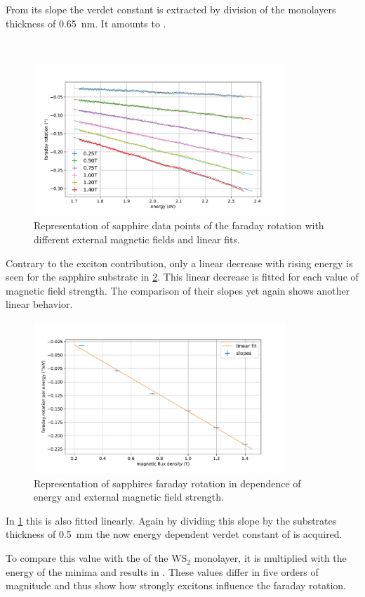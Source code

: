 From its slope the verdet constant is extracted by division of the monolayers thickness of \SI{0.65}{\nano\meter}.
It amounts to \SI{}{}. %

\

\begin{figure}[!ht]
    \centering
    \includegraphics[width=0.85\textwidth]{plots/sapphire_lins.pdf}
    \caption{Representation of sapphire data points of the faraday rotation with different external magnetic fields and linear fits.}
    \label{fig_sapphire_lins}
\end{figure}
Contrary to the exciton contribution, only a linear decrease with rising energy is seen for the sapphire substrate in \cref{fig_sapphire_slopes}.
This linear decrease is fitted for each value of magnetic field strength.
The comparison of their slopes yet again shows another linear behavior.

\begin{figure}[!ht]
    \centering
    \includegraphics[width=0.85\textwidth]{plots/sapphire_slopes.pdf}
    \caption{Representation of sapphires faraday rotation in dependence of energy and external magnetic field strength.}
    \label{fig_sapphire_slopes}
\end{figure}
In \cref{fig_sapphire_lins} this is also fitted linearly.
Again by dividing this slope by the substrates thickness of \SI{0.5}{\milli\meter} the now energy dependent verdet constant of \SI{}{} is acquired.

To compare this value with the \SI{}{} of the WS$_2$ monolayer, it is multiplied with the energy of the minima and results in \SI{}{}.
These values differ in five orders of magnitude and thus show how strongly excitons influence the faraday rotation.

